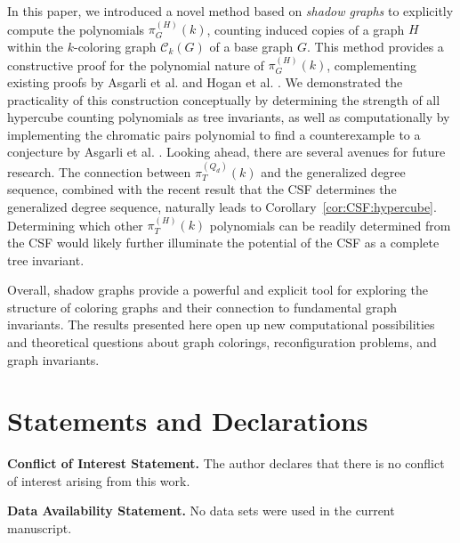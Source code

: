 \documentclass[12pt,reqno,dvipsnames]{amsart}
\theoremstyle{definition}
\begin{document}
In this paper, we introduced a novel method based on \emph{shadow graphs} to explicitly compute the polynomials $\pi_G^{(H)}(k)$, counting induced copies of a graph $H$ within the $k$-coloring graph $\mathcal{C}_k(G)$ of a base graph $G$. This method provides a constructive proof for the polynomial nature of $\pi_G^{(H)}(k)$, complementing existing proofs by Asgarli et al. \cite{AKLR25} and Hogan et al. \cite{HSTT24}. We demonstrated the practicality of this construction conceptually by determining the strength of all hypercube counting polynomials as tree invariants, as well as computationally by implementing the chromatic pairs polynomial to find a counterexample to a conjecture by Asgarli et al. \cite{AKLR25}. Looking ahead, there are several avenues for future research. The connection between $\pi_T^{(Q_d)}(k)$ and the generalized degree sequence, combined with the recent result that the CSF determines the generalized degree sequence, naturally leads to Corollary~\ref{cor:CSF:hypercube}. Determining which other $\pi_T^{(H)}(k)$ polynomials can be readily determined from the CSF would likely further illuminate the potential of the CSF as a complete tree invariant. 

Overall, shadow graphs provide a powerful and explicit tool for exploring the structure of coloring graphs and their connection to fundamental graph invariants. The results presented here open up new computational possibilities and theoretical questions about graph colorings, reconfiguration problems, and graph invariants.
\section{Statements and Declarations}
\textbf{Conflict of Interest Statement.} The author declares that there is no conflict of interest arising from this work.

\textbf{Data Availability Statement.} No data sets were used in the current manuscript.


\end{document}

